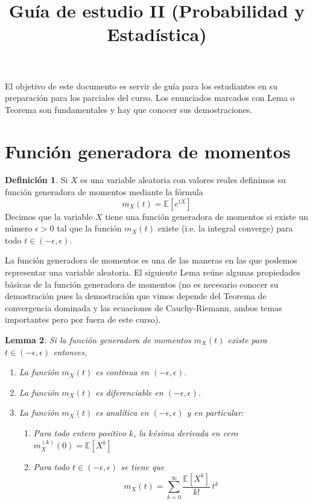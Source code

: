 \documentclass[12pt]{amsart}
\title{Guía de estudio II (Probabilidad y Estadística)}
\newtheorem{lemma}{Lemma}[section]
\theoremstyle{definition}
\newtheorem{definition}[lemma]{Definición}
\newcommand{\EE}{\ensuremath{\mathbb{E}}}
\begin{document}
\maketitle
El objetivo de este documento es servir de guía para los estudiantes en su preparación para los parciales del curso.
Los enunciados marcados con Lema o Teorema son fundamentales y hay que conocer sus demostraciones. 

\section{Función generadora de momentos}

\begin{definition} Si $X$ es una variable aleatoria con valores reales definimos su función generadora de momentos mediante la fórmula
    \[m_X(t)=\EE[e^{tX}]\]
Decimos que la variable $X$ tiene una función generadora de momentos si existe un número $\epsilon>0$ tal que la función $m_X(t)$ existe (i.e. la integral converge) para todo $t\in (-\epsilon,\epsilon)$.
\end{definition}

La función generadora de momentos es una de las maneras en las que podemos representar una variable aleatoria. 
El siguiente Lema reúne algunas propiedades básicas de la función generadora de momentos (no es necesario conocer su demostración pues la demostración que vimos depende del Teorema de convergencia dominada y las ecuaciones de Cauchy-Riemann, ambos temas importantes pero por fuera de este curso).

\begin{lemma} Si la función generadora de momentos $m_X(t)$ existe para $t\in (-\epsilon,\epsilon)$ entonces,
    \begin{enumerate}
        \item La función $m_X(t)$ es continua en $(-\epsilon,\epsilon)$.
        \item La función $m_X(t)$ es diferenciable en $(-\epsilon,\epsilon)$.
        \item La función $m_X(t)$ es analítica en $(-\epsilon,\epsilon)$ y en particular:
        \begin{enumerate}
            \item Para todo entero positivo $k$, la $k$ésima derivada en cero $m_X^{(k)}(0) = \EE[X^k]$ 
            \item Para todo $t\in (-\epsilon,\epsilon)$ se tiene que
            \[m_X(t)=\sum_{k=0}^\infty \frac{\EE[X^k]}{k!}\,t^k \]
        \end{enumerate}
    \end{enumerate}
\end{lemma}
\end{document}
